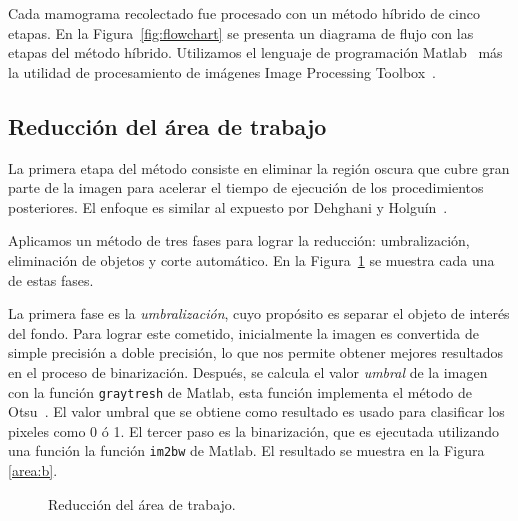 Cada mamograma recolectado fue procesado con un método híbrido de cinco etapas.
En la Figura~\ref{fig:flowchart} se presenta un diagrama de flujo con las
etapas del método híbrido. Utilizamos el lenguaje de programación
Matlab~\cite{matlab} más la utilidad de procesamiento de imágenes Image
Processing Toolbox~\cite{ipt}.

\shorthandoff{>} %
    
\shorthandon{>}

\subsection{Reducción del área de trabajo}

La primera etapa del método consiste en eliminar la región oscura que cubre
gran parte de la imagen para acelerar el tiempo de ejecución de los
procedimientos posteriores. El enfoque es similar al expuesto por Dehghani y
Holguín~\cite{dehghani2011method, holguinpre}.

Aplicamos un método de tres fases para lograr la reducción: umbralización,
eliminación de objetos y corte automático. En la Figura~\ref{reduction} se
muestra cada una de estas fases.

La primera fase es la \textit{umbralización}, cuyo propósito es separar el
objeto de interés del fondo. Para lograr este cometido, inicialmente la imagen
es convertida de simple precisión a doble precisión, lo que nos permite obtener
mejores resultados en el proceso de binarización. Después, se calcula el valor
\textit{umbral} de la imagen con la función \texttt{graytresh} de Matlab, esta
función implementa el método de Otsu~\cite{otsumethod}. El valor umbral que se
obtiene como resultado es usado para clasificar los pixeles como 0 ó 1. El
tercer paso es la binarización, que es ejecutada utilizando una función la
función \texttt{im2bw} de Matlab. El resultado se muestra en la Figura
\ref{area:b}.

\begin{figure}[h]
    \centering


    \bigskip


  \caption[Reducción del área de trabajo]
  {Reducción del área de trabajo.}
  \label{reduction}
\end{figure}

